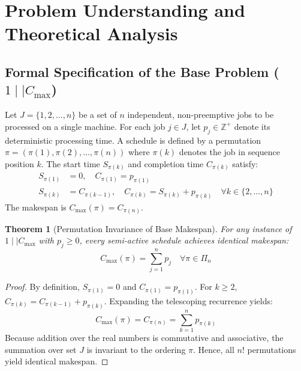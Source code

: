 \documentclass[journal]{IEEEtran}
\newtheorem{theorem}{Theorem}
\begin{document}
\section{Problem Understanding and Theoretical Analysis}
\label{sec:problem_understanding}

\subsection{Formal Specification of the Base Problem ($1 \mid\mid C_{\max}$)}
Let $J = \{1, 2, \dots, n\}$ be a set of $n$ independent, non-preemptive jobs to be processed on a single machine. For each job $j \in J$, let $p_j \in \mathbb{Z}^+$ denote its deterministic processing time. A schedule is defined by a permutation $\pi = (\pi(1), \pi(2), \dots, \pi(n))$ where $\pi(k)$ denotes the job in sequence position $k$. The start time $S_{\pi(k)}$ and completion time $C_{\pi(k)}$ satisfy:
\begin{align}
    S_{\pi(1)} &= 0, \quad C_{\pi(1)} = p_{\pi(1)} \\
    S_{\pi(k)} &= C_{\pi(k-1)}, \quad C_{\pi(k)} = S_{\pi(k)} + p_{\pi(k)} \quad \forall k \in \{2, \dots, n\}
\end{align}
The makespan is $C_{\max}(\pi) = C_{\pi(n)}$.

\begin{theorem}[Permutation Invariance of Base Makespan]
For any instance of $1 \mid\mid C_{\max}$ with $p_j \ge 0$, every semi-active schedule achieves identical makespan:
\begin{equation}
    C_{\max}(\pi) = \sum_{j=1}^n p_j \quad \forall \pi \in \Pi_n
\end{equation}
\end{theorem}

\begin{proof}
By definition, $S_{\pi(1)} = 0$ and $C_{\pi(1)} = p_{\pi(1)}$. For $k \ge 2$, $C_{\pi(k)} = C_{\pi(k-1)} + p_{\pi(k)}$. Expanding the telescoping recurrence yields:
\begin{equation}
    C_{\max}(\pi) = C_{\pi(n)} = \sum_{k=1}^n p_{\pi(k)}
\end{equation}
Because addition over the real numbers is commutative and associative, the summation over set $J$ is invariant to the ordering $\pi$. Hence, all $n!$ permutations yield identical makespan.
\end{proof}
\end{document}
